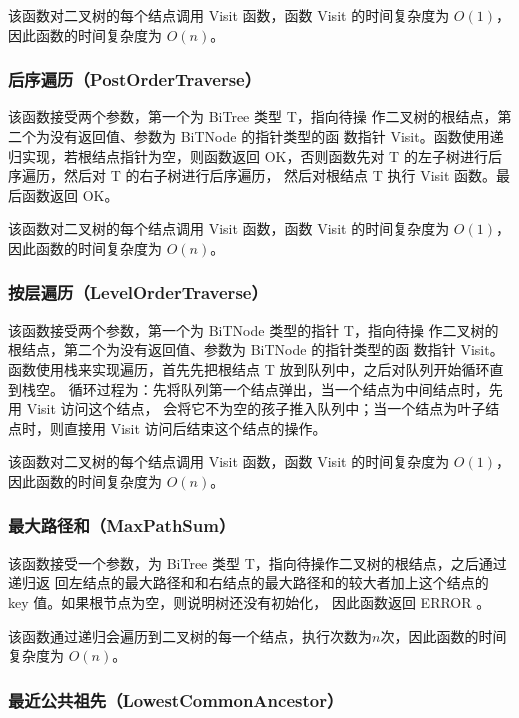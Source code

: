 \documentclass[supercite]{Experimental_Report}
\theoremstyle{definition}
\begin{document}
该函数对二叉树的每个结点调用 Visit 函数，函数 Visit 的时间复杂度为
$O(1)$，因此函数的时间复杂度为 $O(n)$。

\subsubsection{后序遍历（PostOrderTraverse）}

该函数接受两个参数，第一个为 BiTree 类型 T，指向待操
作二叉树的根结点，第二个为没有返回值、参数为 BiTNode 的指针类型的函
数指针 Visit。函数使用递归实现，若根结点指针为空，则函数返回
OK，否则函数先对 T 的左子树进行后序遍历，然后对 T 的右子树进行后序遍历，
然后对根结点 T 执行 Visit 函数。最后函数返回 OK。

该函数对二叉树的每个结点调用 Visit 函数，函数 Visit 的时间复杂度为
$O(1)$，因此函数的时间复杂度为 $O(n)$。

\subsubsection{按层遍历（LevelOrderTraverse）}

该函数接受两个参数，第一个为 BiTNode 类型的指针 T，指向待操
作二叉树的根结点，第二个为没有返回值、参数为 BiTNode 的指针类型的函
数指针 Visit。函数使用栈来实现遍历，首先先把根结点 T 放到队列中，之后对队列开始循环直到栈空。
循环过程为：先将队列第一个结点弹出，当一个结点为中间结点时，先用 Visit 访问这个结点，
会将它不为空的孩子推入队列中；当一个结点为叶子结点时，则直接用 Visit 访问后结束这个结点的操作。

该函数对二叉树的每个结点调用 Visit 函数，函数 Visit 的时间复杂度为
$O(1)$，因此函数的时间复杂度为 $O(n)$。

\subsubsection{最大路径和（MaxPathSum）}

该函数接受一个参数，为 BiTree 类型 T，指向待操作二叉树的根结点，之后通过递归返
回左结点的最大路径和和右结点的最大路径和的较大者加上这个结点的 key 值。如果根节点为空，则说明树还没有初始化，
因此函数返回 ERROR 。

该函数通过递归会遍历到二叉树的每一个结点，执行次数为$n$次，因此函数的时间复杂度为 $O(n)$。

\subsubsection{最近公共祖先（LowestCommonAncestor）}
\end{document}
